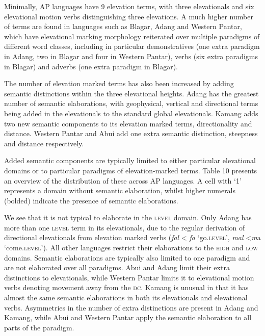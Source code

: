 Minimally, AP languages have 9 elevation terms, with three elevationals and six elevational motion verbs distinguishing three elevations. A much higher number of terms are found in languages such as Blagar, Adang and Western Pantar, which have elevational marking morphology reiterated over multiple paradigms of different word classes, including in particular demonstratives (one extra paradigm in Adang, two in Blagar and four in Western Pantar), verbs (six extra paradigms in Blagar) and adverbs (one extra paradigm in Blagar).

The number of elevation marked terms has also been increased by adding semantic distinctions within the three elevational heights. Adang has the greatest number of semantic elaborations, with geophysical, vertical and directional terms being added in the elevationals to the standard global elevationals. Kamang adds two new semantic components to its elevation marked terms, directionality and distance. Western Pantar and Abui add one extra semantic distinction, steepness and distance respectively. 

Added semantic components are typically limited to either particular elevational domains or to particular paradigms of elevation-marked terms. Table 10 presents an overview of the distribution of these across AP languages. A cell with `1' represents a domain without semantic elaboration, whilst higher numerals (bolded) indicate the presence of semantic elaborations. 

We see that it is not typical to elaborate in the \textsc{level} domain. Only Adang has more than one \textsc{level} term in its elevationals, due to the regular derivation of directional elevationals from elevation marked verbs (\textit{fal}\textit{{\textepsilon}} {\textless} \textit{fa} `go\textsc{.level',} \textit{mal}\textit{{\textepsilon}} {\textless}\textit ma  `come\textsc{.level'}). All other languages restrict their elaborations to the \textsc{high} and \textsc{low} domains. Semantic elaborations are typically also limited to one paradigm and are not elaborated over all paradigms. Abui and Adang limit their extra distinctions to elevationals, while Western Pantar limits it to elevational motion verbs denoting movement away from the \textsc{dc}. Kamang is unusual in that it has almost the same semantic elaborations in both its elevationals and elevational verbs. Asymmetries in the number of extra distinctions are present in Adang and Kamang, while Abui and Western Pantar apply the semantic elaboration to all parts of the paradigm.
 


